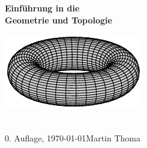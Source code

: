 \begin{titlepage}
\thispagestyle{empty}
\ifAFive
    \par\vspace{4cm}
\else
    \par\vspace{10cm}
\fi
\begin{center}
{\Large \textbf{Einführung in die}} \\[2ex]
{\Large \textbf{Geometrie und Topologie}}
\vfill

\includegraphics[width=0.9\linewidth]{figures/Torus.pdf}
\vfill
\hrulefill
\end{center}
\ \\[-5ex]
0. Auflage, \today \hfill Martin Thoma
\end{titlepage}
